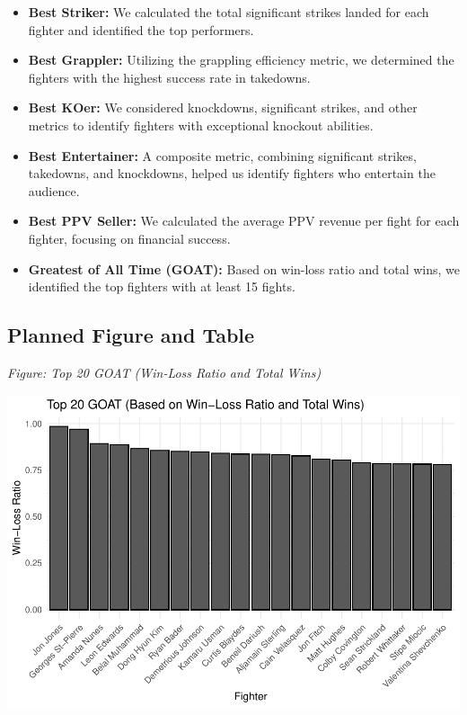 \documentclass[
  man,floatsintext]{apa6}
\begin{document}
\begin{itemize}
\item
  \textbf{Best Striker:} We calculated the total significant strikes landed for each fighter and identified the top performers.
\item
  \textbf{Best Grappler:} Utilizing the grappling efficiency metric, we determined the fighters with the highest success rate in takedowns.
\item
  \textbf{Best KOer:} We considered knockdowns, significant strikes, and other metrics to identify fighters with exceptional knockout abilities.
\item
  \textbf{Best Entertainer:} A composite metric, combining significant strikes, takedowns, and knockdowns, helped us identify fighters who entertain the audience.
\item
  \textbf{Best PPV Seller:} We calculated the average PPV revenue per fight for each fighter, focusing on financial success.
\item
  \textbf{Greatest of All Time (GOAT):} Based on win-loss ratio and total wins, we identified the top fighters with at least 15 fights.
\end{itemize}

\hypertarget{planned-figure-and-table}{%
\subsection{Planned Figure and Table}\label{planned-figure-and-table}}

\emph{Figure: Top 20 GOAT (Win-Loss Ratio and Total Wins)}

\includegraphics{Into-the-UFC--outline-_files/figure-latex/unnamed-chunk-1-1.pdf}
\end{document}
